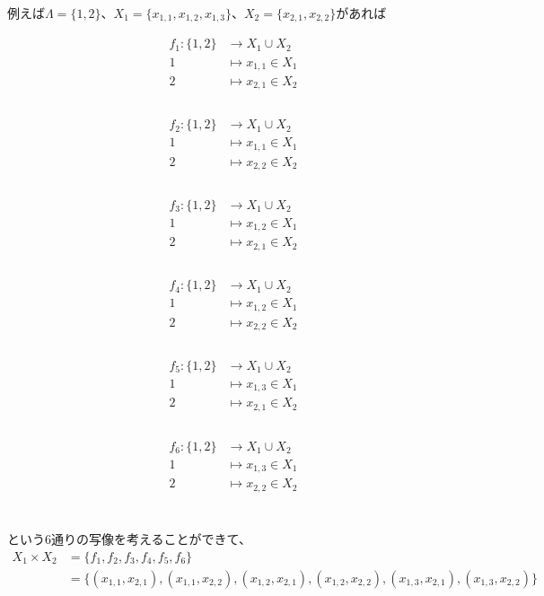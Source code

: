 \documentclass[a4j]{jsarticle}
\begin{document}
例えば$\Lambda=\{1,2\}$、$X_1=\{x_{1,1},x_{1,2},x_{1,3}\}$、$X_2=\{x_{2,1},x_{2,2}\}$があれば
\begin{multicols}{3}
	\begin{align*}
		f_1 : \{1,2\} & \rightarrow X_1 \cup X_2 \\
		1             & \mapsto x_{1,1} \in X_1  \\
		2             & \mapsto x_{2,1}\in X_2   \\
	\end{align*}\\
	\begin{align*}
		f_2 : \{1,2\} & \rightarrow X_1 \cup X_2 \\
		1             & \mapsto x_{1,1} \in X_1  \\
		2             & \mapsto x_{2,2}\in X_2   \\
	\end{align*}\\
	\begin{align*}
		f_3 : \{1,2\} & \rightarrow X_1 \cup X_2 \\
		1             & \mapsto x_{1,2} \in X_1  \\
		2             & \mapsto x_{2,1}\in X_2   \\
	\end{align*}\\
	\begin{align*}
		f_4 : \{1,2\} & \rightarrow X_1 \cup X_2 \\
		1             & \mapsto x_{1,2} \in X_1  \\
		2             & \mapsto x_{2,2}\in X_2   \\
	\end{align*}\\
	\begin{align*}
		f_5 : \{1,2\} & \rightarrow X_1 \cup X_2 \\
		1             & \mapsto x_{1,3} \in X_1  \\
		2             & \mapsto x_{2,1}\in X_2   \\
	\end{align*}\\
	\begin{align*}
		f_6 : \{1,2\} & \rightarrow X_1 \cup X_2 \\
		1             & \mapsto x_{1,3} \in X_1  \\
		2             & \mapsto x_{2,2}\in X_2   \\
	\end{align*}\\
\end{multicols}
という6通りの写像を考えることができて、
\begin{align*}
	X_1 \times X_2 & = \{f_1,f_2,f_3,f_4,f_5,f_6\}                                                                                     \\
	               & = \{(x_{1,1},x_{2,1}),(x_{1,1},x_{2,2}),(x_{1,2},x_{2,1}),(x_{1,2},x_{2,2}),(x_{1,3},x_{2,1}),(x_{1,3},x_{2,2})\}
\end{align*}\\
\end{document}
